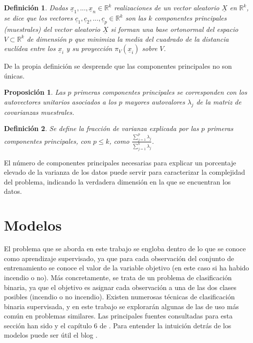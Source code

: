 \documentclass[12pt,a4paper,]{book}
\newcounter{dummy}
\numberwithin{dummy}{section}
\theoremstyle{ocrenumbox}
\theoremstyle{blacknumex}
\theoremstyle{blacknumbox}
\newtheorem{definitionT}{Definición}[section]  %
\theoremstyle{ocrenum}
\newtheorem{proposition}[dummy]{Proposición} %
\newenvironment{definition}{\begin{dBox}\begin{definitionT}}{\end{definitionT}\end{dBox}}
\theoremstyle{ocrenum}
\begin{document}
\begin{definition}
Dadas $\underline x_1, ..., \underline x_n \in \mathbb{R}^k$ realizaciones de un vector aleatorio $\underline X$ en $\mathbb{R}^k$, se dice que los vectores $\underline c_1, \underline c_2,...,\underline c_p \in \mathbb{R}^k$ son las $k$ componentes principales (muestrales) del vector aleatorio $\underline X$ si forman una base ortonormal del espacio $V \subset \mathbb{R}^k$ de dimensión $p$ que minimiza la media del cuadrado de la distancia euclídea entre los $\underline x_i$ y su proyección $\pi_{V}(\underline x_i)$ sobre $V$.
\end{definition}

De la propia definición se desprende que las componentes principales no
son únicas.

\begin{proposition}
Las $p$ primeras componentes principales se corresponden con los autovectores unitarios asociados a los $p$ mayores autovalores $\lambda_j$ de la matriz de covarianzas muestrales. 
\end{proposition}

\begin{definition}
Se define la fracción de varianza explicada por las $p$ primeras componentes principales, con $p \le k$, como $\frac{\sum_{j=1}^p \lambda_j}{\sum_{j=1}^k \lambda_j}$.
\end{definition}

El número de componentes principales necesarias para explicar un
porcentaje elevado de la varianza de los datos puede servir para
caracterizar la complejidad del problema, indicando la verdadera
dimensión en la que se encuentran los datos.

\hypertarget{modelos}{%
\section{Modelos}\label{modelos}}

El problema que se aborda en este trabajo se engloba dentro de lo que se
conoce como aprendizaje supervisado, ya que para cada observación del
conjunto de entrenamiento se conoce el valor de la variable objetivo (en
este caso si ha habido incendio o no). Más concretamente, se trata de un
problema de clasificación binaria, ya que el objetivo es asignar cada
observación a una de las dos clases posibles (incendio o no incendio).
Existen numerosas técnicas de clasificación binaria supervisada, y en
este trabajo se explorarán algunas de las de uso más común en problemas
similares. Las principales fuentes consultadas para esta sección han
sido \citep{hastie2009elements} y el capítulo 6 de
\citep{MLmodelSuthaharan}. Para entender la intuición detrás de los
modelos puede ser útil el blog \citep{eight2late}.
\end{document}
